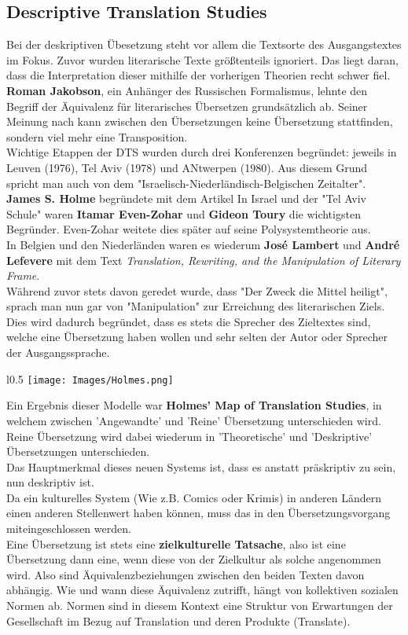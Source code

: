 \documentclass{article}
\begin{document}
	\subsection{Descriptive Translation Studies}
	Bei der deskriptiven Übesetzung steht vor allem die Textsorte des Ausgangstextes im Fokus. Zuvor wurden literarische Texte größtenteils ignoriert. Das liegt daran, dass die Interpretation dieser mithilfe der vorherigen Theorien recht schwer fiel. \\
	\textbf{Roman Jakobson}, ein Anhänger des Russischen Formalismus, lehnte den Begriff der Äquivalenz für literarisches Übersetzen grundsätzlich ab. Seiner Meinung nach kann zwischen den Übersetzungen keine Übersetzung stattfinden, sondern viel mehr eine Transposition. \\
	Wichtige Etappen der DTS wurden durch drei Konferenzen begründet: jeweils in Leuven (1976), Tel Aviv (1978) und ANtwerpen (1980). Aus diesem Grund spricht man auch von dem "Israelisch-Niederländisch-Belgischen Zeitalter". \\
	\textbf{James S. Holme} begründete mit dem Artikel
	In Israel und der "Tel Aviv Schule" waren \textbf{Itamar Even-Zohar} und \textbf{Gideon Toury} die wichtigsten Begründer. Even-Zohar weitete dies später auf seine Polysystemtheorie aus. \\
	In Belgien und den Niederländen waren es wiederum \textbf{José Lambert} und \textbf{André Lefevere} mit dem Text \textit{Translation, Rewriting, and the Manipulation of Literary Frame}. \\
	Während zuvor stets davon geredet wurde, dass "Der Zweck die Mittel heiligt", sprach man nun gar von "Manipulation" zur Erreichung des literarischen Ziels. Dies wird dadurch begründet, dass es stets die Sprecher des Zieltextes sind, welche eine Übersetzung haben wollen und sehr selten der Autor oder Sprecher der Ausgangssprache. \\
	\begin{wrapfigure}{l}{0.5\textwidth}
	\texttt{[image: Images/Holmes.png]}
	\end{wrapfigure}
	Ein Ergebnis dieser Modelle war \textbf{Holmes' Map of Translation Studies}, in welchem zwischen 'Angewandte' und 'Reine' Übersetzung unterschieden wird. Reine Übersetzung wird dabei wiederum in 'Theoretische' und 'Deskriptive' Übersetzungen unterschieden. \\
	Das Hauptmerkmal dieses neuen Systems ist, dass es anstatt präskriptiv zu sein, nun deskriptiv ist. \\
	Da ein kulturelles System (Wie z.B. Comics oder Krimis) in anderen Ländern einen anderen Stellenwert haben können, muss das in den Übersetzungsvorgang miteingeschlossen werden. \\
	Eine Übersetzung ist stets eine \textbf{zielkulturelle Tatsache}, also ist eine Übersetzung dann eine, wenn diese von der Zielkultur als solche angenommen wird. Also sind Äquivalenzbeziehungen zwischen den beiden Texten davon abhängig. Wie und wann diese Äquivalenz zutrifft, hängt von kollektiven sozialen Normen ab. Normen sind in diesem Kontext eine Struktur von Erwartungen der Gesellschaft im Bezug auf Translation und deren Produkte (Translate). \\
\end{document}
